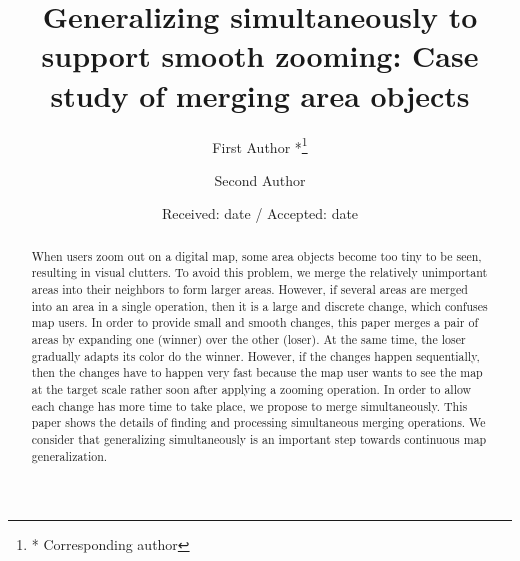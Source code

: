 \documentclass[twocolumn]{svjour3}          %
\begin{document}
\title{Generalizing simultaneously to support smooth zooming:
Case study of merging area objects%
}


\author{First Author *\thanks{* Corresponding author}         \and
        Second Author %
}



\date{Received: date / Accepted: date}


\maketitle

\begin{abstract}
When users zoom out on a digital map, 
some area objects become too tiny to be seen, 
resulting in visual clutters. 
To avoid this problem, 
we merge the relatively unimportant areas into their neighbors to form larger areas.
However, if several areas are merged into an area in a single operation,
then it is a large and discrete change, 
which confuses map users.
In order to provide small and smooth changes,
this paper merges a pair of areas by expanding one
(winner) over the other (loser).
At the same time, the loser gradually adapts its color do the winner.
However, if the changes happen sequentially,
then the changes have to happen very fast 
because the map user wants to see the map at the target scale 
rather soon after applying a zooming operation.
In order to allow each change has more time to take place, 
we propose to merge simultaneously.
This paper shows the details of finding and processing simultaneous merging operations.
We consider that generalizing simultaneously
is an important step towards continuous map generalization.
\end{abstract}
\end{document}
